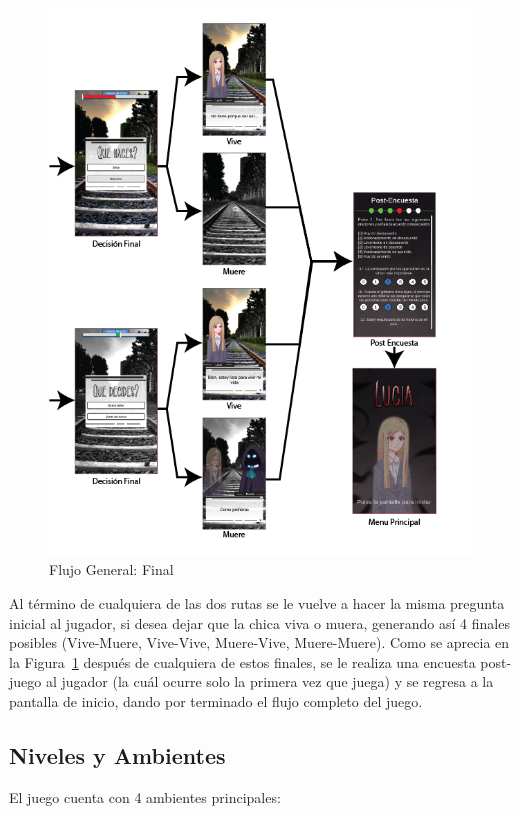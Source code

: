\begin{figure}[h!]
    \centering
    \includegraphics[scale=0.7]{imgs/general-chart-3.png}
    \caption{Flujo General: Final}
    \label{fig:chart-3}
\end{figure}

Al término de cualquiera de las dos rutas se le vuelve a hacer la misma pregunta inicial al jugador, si desea dejar que la chica viva o muera, generando así 4 finales posibles (Vive-Muere, Vive-Vive, Muere-Vive, Muere-Muere). Como se aprecia en la Figura~\ref{fig:chart-3} después de cualquiera de estos finales, se le realiza una encuesta post-juego al jugador (la cuál ocurre solo la primera vez que juega) y se regresa a la pantalla de inicio, dando por terminado el flujo completo del juego. 

\newpage
\subsection{Niveles y Ambientes}
El juego cuenta con 4 ambientes principales:

